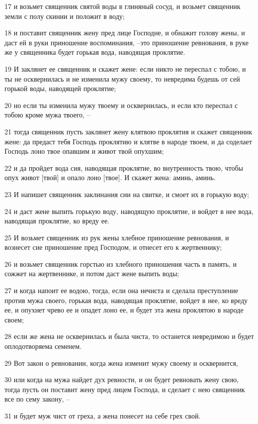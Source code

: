 \par 17 и возьмет священник святой воды в глиняный сосуд, и возьмет священник земли с полу скинии и положит в воду;
\par 18 и поставит священник жену пред лице Господне, и обнажит голову жены, и даст ей в руки приношение воспоминания, --это приношение ревнования, в руке же у священника будет горькая вода, наводящая проклятие.
\par 19 И заклянет ее священник и скажет жене: если никто не переспал с тобою, и ты не осквернилась и не изменила мужу своему, то невредима будешь от сей горькой воды, наводящей проклятие;
\par 20 но если ты изменила мужу твоему и осквернилась, и если кто переспал с тобою кроме мужа твоего, --
\par 21 тогда священник пусть заклянет жену клятвою проклятия и скажет священник жене: да предаст тебя Господь проклятию и клятве в народе твоем, и да соделает Господь лоно твое опавшим и живот твой опухшим;
\par 22 и да пройдет вода сия, наводящая проклятие, во внутренность твою, чтобы опух живот [твой] и опало лоно [твое]. И скажет жена: аминь, аминь.
\par 23 И напишет священник заклинания сии на свитке, и смоет их в горькую воду;
\par 24 и даст жене выпить горькую воду, наводящую проклятие, и войдет в нее вода, наводящая проклятие, ко вреду ее.
\par 25 И возьмет священник из рук жены хлебное приношение ревнования, и вознесет сие приношение пред Господом, и отнесет его к жертвеннику;
\par 26 и возьмет священник горстью из хлебного приношения часть в память, и сожжет на жертвеннике, и потом даст жене выпить воды;
\par 27 и когда напоит ее водою, тогда, если она нечиста и сделала преступление против мужа своего, горькая вода, наводящая проклятие, войдет в нее, ко вреду ее, и опухнет чрево ее и опадет лоно ее, и будет эта жена проклятою в народе своем;
\par 28 если же жена не осквернилась и была чиста, то останется невредимою и будет оплодотворяема семенем.
\par 29 Вот закон о ревновании, когда жена изменит мужу своему и осквернится,
\par 30 или когда на мужа найдет дух ревности, и он будет ревновать жену свою, тогда пусть он поставит жену пред лицем Господа, и сделает с нею священник все по сему закону, --
\par 31 и будет муж чист от греха, а жена понесет на себе грех свой.

